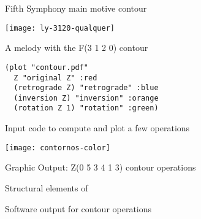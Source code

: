 \documentclass[a0paper]{sciposter}
\begin{document}
\begin{center}
\begin{multicols}{2}

\begin{figure}
  \centering
  \subfigure[Contour F(3 1 2 0)]{
    \texttt{[image: c-3120]}
    \label{fig:c-3120}
  }
  \caption{Fifth Symphony main motive contour}
  \label{fig:5a-sinfonia}
\end{figure}

\begin{figure}
  \centering
  \texttt{[image: ly-3120-qualquer]}
  \caption{A melody with the F(3 1 2 0) contour}
  \label{fig:ly-3120}
\end{figure}

\begin{figure}
  \centering
\begin{verbatim}
(plot "contour.pdf"
  Z "original Z" :red
  (retrograde Z) "retrograde" :blue
  (inversion Z) "inversion" :orange
  (rotation Z 1) "rotation" :green)
\end{verbatim}%
  \caption{Input code to compute and plot a few operations}
  \label{fig:operations-code}
\end{figure}

\begin{figure}
  \centering
  \texttt{[image: contornos-color]}
  \caption{Graphic Output: Z(0 5 3 4 1 3) contour operations}
  \label{fig:operacoes}
\end{figure}

\begin{figure}
  \centering

  \caption{Structural elements of }
  \label{fig:elementos-fugato}
\end{figure}

\begin{figure}
  \centering
  \caption{Software output for  contour operations}
  \label{fig:output-fugato}
\end{figure}

\end{multicols}
\end{center}
\end{document}
